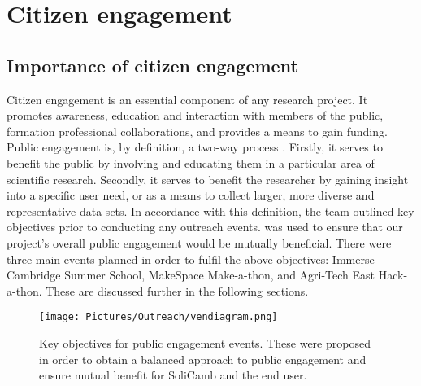 \section{Citizen engagement}

    \subsection{Importance of citizen engagement} \label{Citizen engagement}
    Citizen engagement is an essential component of any research project. It promotes awareness, education and interaction with members of the public, formation professional collaborations, and provides a means to gain funding. Public engagement is, by definition, a two-way process \cite{Public_engagement_definition}. Firstly, it serves to benefit the public by involving and educating them in a particular area of scientific research. Secondly, it serves to benefit the researcher by gaining insight into a specific user need, or as a means to collect larger, more diverse and representative data sets. In accordance with this definition, the team outlined key objectives prior to conducting any outreach events.  was used to ensure that our project's overall public engagement would be mutually beneficial. There were three main events planned in order to fulfil the above objectives: Immerse Cambridge Summer School, MakeSpace Make-a-thon, and Agri-Tech East Hack-a-thon. These are discussed further in the following sections. 
    
    \begin{figure}
        \centering
        \texttt{[image: Pictures/Outreach/vendiagram.png]}
        \caption{Key objectives for public engagement events. These were proposed in order to obtain a balanced approach to public engagement and ensure mutual benefit for SoliCamb and the end user.}
        \label{fig:vendiagram}
    \end{figure}
    
